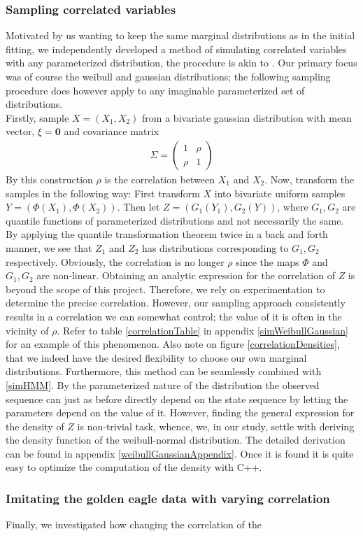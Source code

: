 \subsubsection{Sampling correlated variables}
Motivated by us wanting to keep the same marginal distributions as in the initial fitting, we independently developed a method of simulating correlated variables with any parameterized distribution, the procedure is akin to \cite{thomasWard}. Our primary focus was of course the weibull and gaussian distributions; the following sampling procedure does however apply to any imaginable parameterized set of distributions.\\ Firstly, sample $X = (X_1, X_2)$ from a bivariate gaussian distribution with mean vector, $\xi = \mathbf{0}$ and covariance matrix 
\begin{align}\Sigma = \begin{pmatrix}
    1 & \rho \\
    \rho & 1
\end{pmatrix}
\end{align}
By this construction $\rho$ is the correlation between $X_1$ and $X_2$. Now, transform the samples in the following way: First transform $X$ into bivariate uniform samples $Y = (\Phi(X_1),\Phi(X_2))$. Then let $Z = (G_1(Y_1), G_2(Y))$, where $G_1, G_2$ are quantile functions of parameterized distributions and not necessarily the same. By applying the quantile transformation theorem twice in a back and forth manner, we see that $Z_1$ and $Z_2$ has distributions corresponding to $G_1, G_2$ respectively. Obviously, the correlation is no longer $\rho$ since the maps $\Phi$ and $G_1, G_2$ are non-linear. Obtaining an analytic expression for the correlation of $Z$ is beyond the scope of this project. Therefore, we rely on experimentation to determine the precise correlation. However, our sampling approach consistently results in a correlation we can somewhat control; the value of it is often in the vicinity of $\rho$. Refer to table \ref{correlationTable} in appendix \ref{simWeibullGaussian} for an example of this phenomenon. Also note on figure \ref{correlationDensities}, that we indeed have the desired flexibility to choose our own marginal distributions. Furthermore, this method can be seamlessly combined with \ref{simHMM}. By the parameterized nature of the distribution the observed sequence can just as before directly depend on the state sequence by letting the parameters depend on the value of it. However, finding the general expression for the density of $Z$ is non-trivial task, whence, we, in our study, settle with deriving the density function of the weibull-normal distribution. The detailed derivation can be found in appendix \ref{weibullGaussianAppendix}. Once it is found it is quite easy to optimize the computation of the density with C++\cite{Rcpp}.
\subsubsection{Imitating the golden eagle data with varying correlation}
Finally, we investigated how changing the correlation of the 
